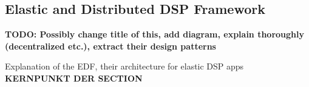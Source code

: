         \subsection{Elastic and Distributed DSP Framework}
        \label{sec:edf}
        \textbf{TODO: Possibly change title of this, add diagram, explain thoroughly (decentralized etc.), extract their design patterns}


        Explanation of the EDF, their architecture for elastic DSP apps \textbf{KERNPUNKT DER SECTION}

